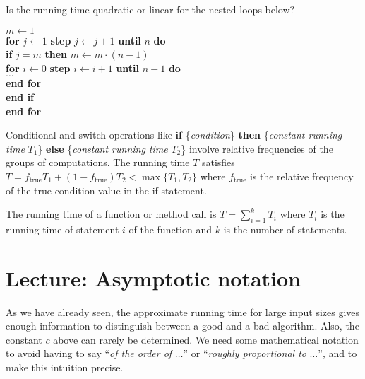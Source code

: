 \begin{Boxample}[6]
\label{exm:nest1}
Is the running time quadratic or linear for the nested loops below?\\

\begin{minipage}{5in}
\Algorbody
{
\(m \leftarrow 1\) \\
\textbf{for} \(j \leftarrow 1\) \textbf{step} \(j \leftarrow j+1\) 
                                    \textbf{until} \(n\) \textbf{do}\\
\>\textbf{if} \(j = m \) \textbf{then} \(m \leftarrow m \cdot (n-1)\) \\
\>\>\textbf{for} \(i \leftarrow  0\) \textbf{step} \(i \leftarrow i+1\) 
                                       \textbf{until} \(n-1\) \textbf{do}\\
\>\>\>$\ldots$  \\
\>\>\textbf{end for} \\
\>\textbf{end if}\\
\textbf{end for} \\
}
\end{minipage}

\end{Boxample}


Conditional and switch operations like \textbf{if}
\{\emph{condition}\} \textbf{then} \{\emph{constant running time}
$T_1$\} \textbf{else} \{\emph{constant running time} $T_2$\} involve
relative frequencies of the groups of computations.  The running time
$T$ satisfies $T = f_\mathrm{true} T_1 + (1 - f_\mathrm{true}) T_2 <
\max \{ T_1, T_2 \}$ where $f_\mathrm{true}$ is the relative frequency
of the true condition value in the if-statement.

The running time of a function or method call is $T = \sum_{i=1}^{k}T_i$
where $T_i$ is the running time of statement \(i\) of the function
and $k$ is the number of statements.


\chapter{Lecture: Asymptotic notation}



As we have already seen, the approximate running time for large input
sizes gives enough information to distinguish between a good and a bad
algorithm. Also, the constant $c$ above can rarely be determined. We
need some mathematical notation to avoid having to say ``\emph{of the
order of} $\ldots$''  or ``\emph{roughly proportional to} $\ldots$'',
and to make this intuition precise.


